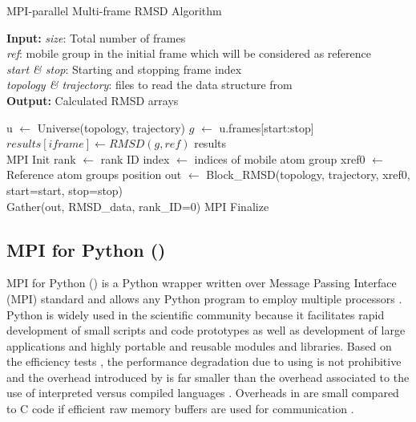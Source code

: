 \begin{algorithm}[ht!]
	\scriptsize
	\caption{MPI-parallel Multi-frame RMSD Algorithm}
	\label{alg:RMSD}
	\hspace*{\algorithmicindent} \textbf{Input:} \emph{size}: Total number of frames \\
	\hspace*{\algorithmicindent} \emph{ref}: mobile group in the initial frame which will be considered as reference \\
	\hspace*{\algorithmicindent} \emph{start \& stop}: Starting and stopping frame index\\
	\hspace*{\algorithmicindent} \emph{topology \& trajectory}: files to read the data structure from \\
	\hspace*{\algorithmicindent} \textbf{Output:} Calculated RMSD arrays
	\begin{algorithmic}[1]
		\State u $\leftarrow$ Universe(topology, trajectory)
		\State $g$ $\leftarrow$ u.frames[start:stop]
		\State $results[iframe] \leftarrow RMSD(g, ref)$
		\EndFor
		\State \Return results
		\EndProcedure
		\\        
		\State MPI Init
		\State rank $\leftarrow$ rank ID
		\State index $\leftarrow$ indices of mobile atom group
		\State xref0 $\leftarrow$ Reference atom group\textsc{}s position
		\State out $\leftarrow$ Block\_RMSD(topology, trajectory, xref0, start=start, stop=stop)
		\\
		\State Gather(out, RMSD\_data, rank\_ID=0)
		\State MPI Finalize
	\end{algorithmic}
\end{algorithm}

\subsection{MPI for Python ()}
MPI for Python () is a Python wrapper written over Message Passing Interface (MPI) standard and allows any Python program to employ multiple processors \cite{Dalcin:2011aa, Dalcin:2005aa}.
Python is widely used in the scientific community because it facilitates rapid development of small scripts and code prototypes as well as development of large applications and highly portable and reusable modules and libraries.
Based on the efficiency tests \cite{Dalcin:2011aa, Dalcin:2005aa}, the performance degradation due to using  is not prohibitive and the overhead introduced by  is far smaller than the overhead associated to the use of interpreted versus compiled languages \cite{GAiN}.
Overheads in  are small compared to C code if efficient raw memory buffers are used for communication \cite{Dalcin:2011aa}.

